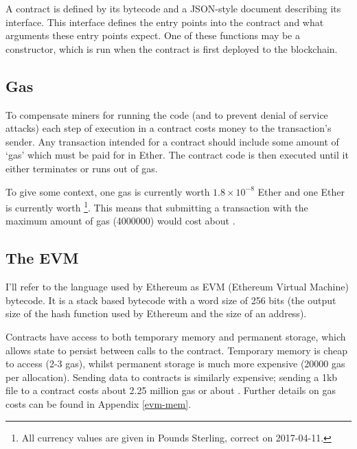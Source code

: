 \documentclass[12pt,a4paper,twoside,openright]{report}
\begin{document}

A contract is defined by its bytecode and a JSON-style document describing its interface.
This interface defines the entry points into the contract and what arguments these entry points expect.
One of these functions may be a constructor, which is run when the contract is first deployed to the blockchain.

\subsection{Gas}

To compensate miners for running the code (and to prevent denial of service attacks) each step of execution in a contract costs money to the transaction's sender.
Any transaction intended for a contract should include some amount of `gas' which must be paid for in Ether.
The contract code is then executed until it either terminates or runs out of gas.

To give some context, one gas is currently worth $1.8 \times 10^{-8}$ Ether and one Ether is currently worth \footnote{
All currency values are given in Pounds Sterling, correct on 2017-04-11.}.
This means that submitting a transaction with the maximum amount of gas (4000000) would cost about .

\subsection{The EVM}


I'll refer to the language used by Ethereum as EVM (Ethereum Virtual Machine) bytecode.
It is a stack based bytecode with a word size of 256 bits (the output size of the hash function used by Ethereum and the size of an address).

Contracts have access to both temporary memory and permanent storage, which allows state to persist between calls to the contract.
Temporary memory is cheap to access (2-3 gas), whilst permanent storage is much more expensive (20000 gas per allocation).
Sending data to contracts is similarly expensive; sending a 1kb file to a contract costs about 2.25 million gas or about .
Further details on gas costs can be found in Appendix \ref{evm-mem}.
\end{document}
